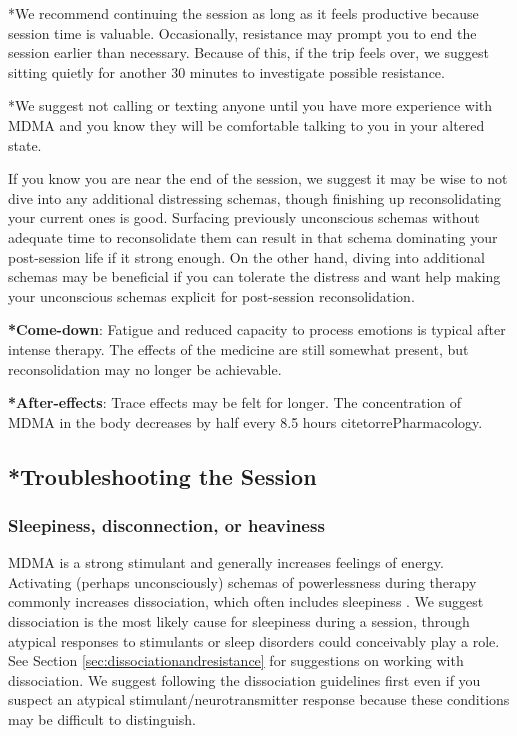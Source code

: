 \documentclass[12pt,letterpaper]{article}
\begin{document}
*We recommend continuing the session as long as it feels productive because session time is valuable. Occasionally, resistance may prompt you to end the session earlier than necessary. Because of this, if the trip feels over, we suggest sitting quietly for another 30 minutes to investigate possible resistance.

*We suggest not calling or texting anyone until you have more experience with MDMA and you know they will be comfortable talking to you in your altered state.

If you know you are near the end of the session, we suggest it may be wise to not dive into any additional distressing schemas, though finishing up reconsolidating your current ones is good. Surfacing previously unconscious schemas without adequate time to reconsolidate them can result in that schema dominating your post-session life if it strong enough. On the other hand, diving into additional schemas may be beneficial if you can tolerate the distress and want help making your unconscious schemas explicit for post-session reconsolidation.

\textbf{*Come-down}: 
Fatigue and reduced capacity to process emotions is typical after intense therapy. The effects of the medicine are still somewhat present, but reconsolidation may no longer be achievable.

\textbf{*After-effects}:
Trace effects may be felt for longer. The concentration of MDMA in the body decreases by half every 8.5 hours cite{torrePharmacology}.

\subsection{*Troubleshooting the Session}
\label{sec:troubleshooting}
\subsubsection{Sleepiness, disconnection, or heaviness}
MDMA is a strong stimulant and generally increases feelings of energy. Activating (perhaps unconsciously) schemas of powerlessness during therapy commonly increases dissociation, which often includes sleepiness \cite{kozlowskaDefenseCascade}. We suggest dissociation is the most likely cause for sleepiness during a session, through atypical responses to stimulants or sleep disorders could conceivably play a role. See Section \ref{sec:dissociationandresistance} for suggestions on working with dissociation. We suggest following the dissociation guidelines first even if you suspect an atypical stimulant/neurotransmitter response because these conditions may be difficult to distinguish.
\end{document}
